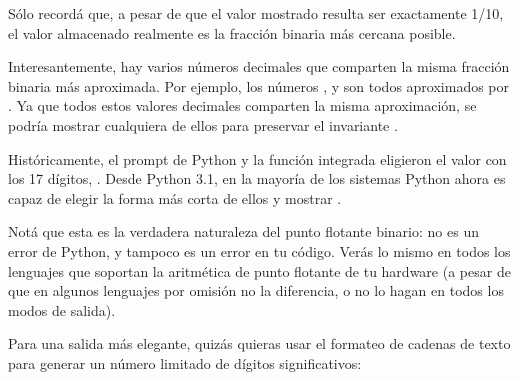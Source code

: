 \documentclass[a4,10pt,spanish]{sphinxmanual}
\begin{document}
\begin{sphinxVerbatim}[commandchars=\\\{\}]
  
\end{sphinxVerbatim}

\sphinxAtStartPar
Sólo recordá que, a pesar de que el valor mostrado resulta ser exactamente 1/10, el valor almacenado realmente es la fracción binaria más cercana posible.

\sphinxAtStartPar
Interesantemente, hay varios números decimales que comparten la misma fracción binaria más aproximada. Por ejemplo, los números ,  y  son todos aproximados por .  Ya que todos estos valores decimales comparten la misma aproximación, se podría mostrar cualquiera de ellos para preservar el invariante .

\sphinxAtStartPar
Históricamente, el prompt de Python y la función integrada  eligieron el valor con los 17 dígitos, .  Desde Python 3.1, en la mayoría de los sistemas Python ahora es capaz de elegir la forma más corta de ellos y mostrar .

\sphinxAtStartPar
Notá que esta es la verdadera naturaleza del punto flotante binario: no es un error de Python, y tampoco es un error en tu código.  Verás lo mismo en todos los lenguajes que soportan la aritmética de punto flotante de tu hardware (a pesar de que en algunos lenguajes por omisión no  la diferencia, o no lo hagan en todos los modos de salida).

\sphinxAtStartPar
Para una salida más elegante, quizás quieras usar el formateo de cadenas de texto para generar un número limitado de dígitos significativos:

\begin{sphinxVerbatim}[commandchars=\\\{\}]
   

    

\end{sphinxVerbatim}
\end{document}
